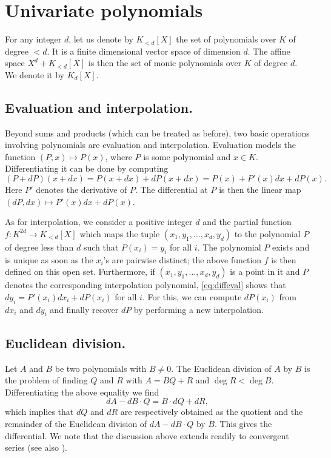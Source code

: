 \documentclass{sig-alternate}
\begin{document}
{\color{Bittersweet}

\section{Univariate polynomials}
\label{sec:polynomials}

For any integer $d$, let us denote by $K_{< d}[X]$ the set of 
polynomials over $K$ of degree $< d$. It is a finite dimensional vector 
space of dimension $d$. The affine space $X^d + K_{< d}[X]$ is then 
the set of monic polynomials over $K$ of degree $d$. We denote it by 
$K_d[X]$.

\subsection*{Evaluation and interpolation.}

Beyond sums and products (which can be treated as before), two basic 
operations involving polynomials are evaluation and interpolation.
Evaluation models the function $(P,x) \mapsto P(x)$, where
$P$ is some polynomial and $x \in K$. Differentiating
it can be done by computing
\begin{equation}
\label{eq:diffeval}
(P + dP)(x + dx) = P(x + dx) + dP(x + dx) = P(x) + P'(x) dx + dP(x).
\end{equation}
Here $P'$ denotes the derivative of 
$P$. The differential at $P$ is then the linear map $(dP, dx) \mapsto 
P'(x) dx + dP(x)$.

As for interpolation, we consider a positive integer $d$ and the partial 
function $f : K^{2d} \to K_{< d}[X]$ which maps the tuple $(x_1, y_1, 
\ldots, x_d, y_d)$ to the polynomial $P$ of degree less than $d$ such 
that $P(x_i) = y_i$ for all $i$. The polynomial $P$ exists and is unique 
as soon as the $x_i$'s are pairwise distinct; the above function $f$ is 
then defined on this open set. Furthermore, if $(x_1, y_1, \ldots, x_d, 
y_d)$ is a point in it and $P$ denotes the corresponding interpolation 
polynomial, \eqref{eq:diffeval} shows that $d y_i = P'(x_i) dx_i + 
dP(x_i)$ for all $i$. For this, we can compute $dP(x_i)$ from $d x_i$ 
and $d y_i$ and finally recover $dP$ by performing a new interpolation.

\subsection*{Euclidean division.}

Let $A$ and $B$ be two polynomials with $B \neq 0$. The Euclidean division of 
$A$ by $B$ is the problem of finding $Q$ and $R$ with $A = BQ + R$ and $\deg R < \deg B$. 
Differentiating the above equality we find
\[
dA - dB \cdot Q = B \cdot dQ + dR,
\]
which implies that $dQ$ and $dR$ are respectively obtained as the 
quotient and the remainder of the Euclidean division of $dA - dB \cdot 
Q$ by $B$. This gives the differential. We note that the discussion 
above extends readily to convergent series (see also 
\cite{caruso-lubicz:14a}).

}
\end{document}
